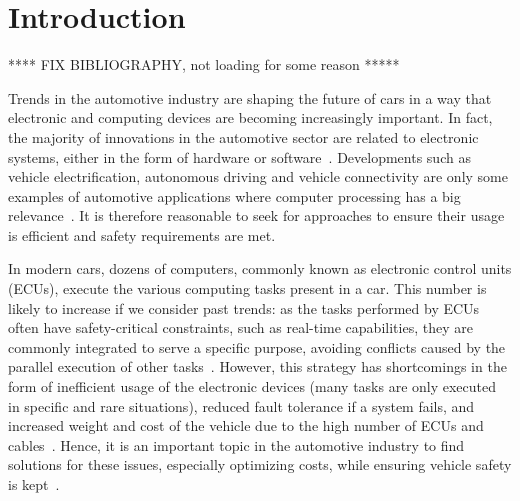 
\chapter{Introduction}\label{chap:introduction}

**** FIX BIBLIOGRAPHY, not loading for some reason *****

Trends in the automotive industry are shaping the future of cars in a way that electronic and computing devices are becoming increasingly important. In fact, the majority of innovations in the automotive sector are related to electronic systems, either in the form of hardware or software~\parencite{ey1}. Developments such as vehicle electrification, autonomous driving and vehicle connectivity are only some examples of automotive applications where computer processing has a big relevance~\parencite{pwc1}. It is therefore reasonable to seek for approaches to ensure their usage is efficient and safety requirements are met.

In modern cars, dozens of computers, commonly known as electronic control units (ECUs), execute the various computing tasks present in a car. This number is likely to increase if we consider past trends: as the tasks performed by ECUs often have safety-critical constraints, such as real-time capabilities, they are commonly integrated to serve a specific purpose, avoiding conflicts caused by the parallel execution of other tasks~\parencite{vipin1, vipin2}. However, this strategy has shortcomings in the form of inefficient usage of the electronic devices (many tasks are only executed in specific and rare situations), reduced fault tolerance if a system fails, and increased weight and cost of the vehicle due to the high number of ECUs and cables~\parencite{vipin2, baunach1}. Hence, it is an important topic in the automotive industry to find solutions for these issues, especially optimizing costs, while ensuring vehicle safety is kept~\parencite{mckinsey1}.

